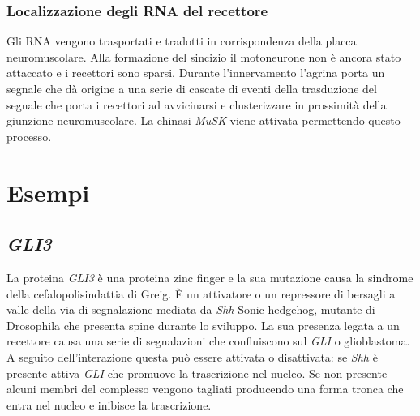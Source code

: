 		\subsubsection{Localizzazione degli RNA del recettore}
		Gli RNA vengono trasportati e tradotti in corrispondenza della placca neuromuscolare.
		Alla formazione del sincizio il motoneurone non \`e ancora stato attaccato e i recettori sono sparsi.
		Durante l'innervamento l'agrina porta un segnale che d\`a origine a una serie di cascate di eventi della trasduzione del segnale che porta i recettori ad avvicinarsi e clusterizzare in prossimit\`a della giunzione neuromuscolare.
		La chinasi \emph{MuSK}  viene attivata permettendo questo processo.

\section{Esempi}

	\subsection{\emph{GLI3}}
	La proteina \emph{GLI3} \`e una proteina zinc finger e la sua mutazione causa la sindrome della cefalopolisindattia di Greig.
	\`E un attivatore o un repressore di bersagli a valle della via di segnalazione mediata da \emph{Shh} Sonic hedgehog, mutante di Drosophila che presenta spine durante lo sviluppo.
	La sua presenza legata a un recettore causa una serie di segnalazioni che confluiscono sul \emph{GLI} o glioblastoma.
	A seguito dell'interazione questa pu\`o essere attivata o disattivata: se \emph{Shh} \`e presente attiva \emph{GLI} che promuove la trascrizione nel nucleo.
	Se non presente alcuni membri del complesso vengono tagliati producendo una forma tronca che entra nel nucleo e inibisce la trascrizione.

